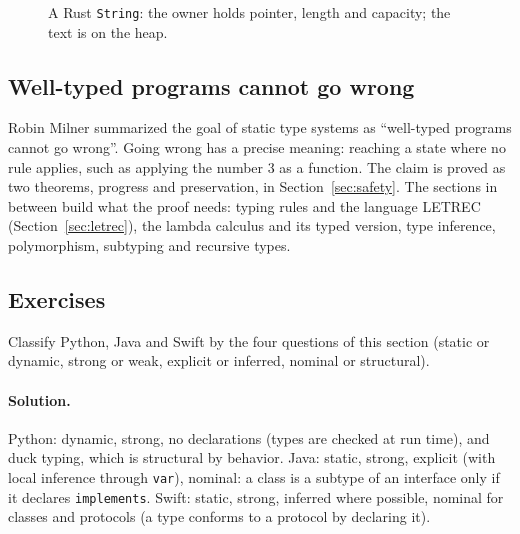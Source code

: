 \begin{figure}[h]
\centering
{}
\caption{A Rust \texttt{String}: the owner holds pointer, length and capacity; the text is on the heap.}
\label{fig:owned}
\end{figure}

\subsection{Well-typed programs cannot go wrong}

Robin Milner summarized the goal of static type systems as ``well-typed
programs cannot go wrong''. Going wrong has a precise meaning: reaching a
state where no rule applies, such as applying the number 3 as a function. The
claim is proved as two theorems, progress and preservation, in
Section~\ref{sec:safety}. The sections in between build what the proof needs:
typing rules and the language LETREC (Section~\ref{sec:letrec}), the lambda
calculus and its typed version, type inference, polymorphism, subtyping and
recursive types.

\subsection{Exercises}

\begin{exercise}
Classify Python, Java and Swift by the four questions of this section
(static or dynamic, strong or weak, explicit or inferred, nominal or
structural).
\end{exercise}

\paragraph{Solution.} Python: dynamic, strong, no declarations (types are
checked at run time), and duck typing, which is structural by behavior. Java:
static, strong, explicit (with local inference through \texttt{var}), nominal:
a class is a subtype of an interface only if it declares \texttt{implements}.
Swift: static, strong, inferred where possible, nominal for classes and
protocols (a type conforms to a protocol by declaring it).

